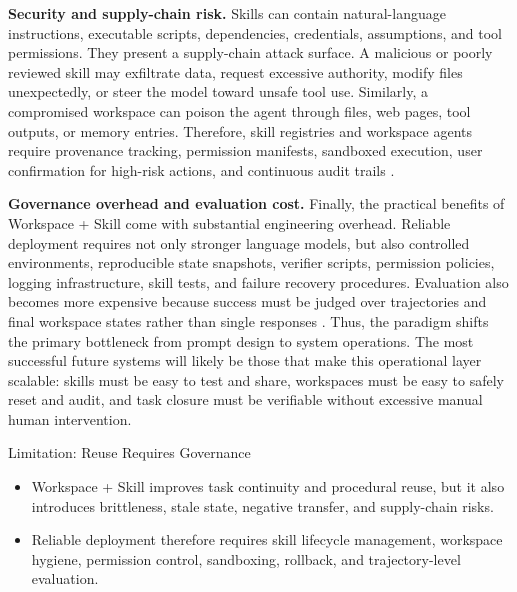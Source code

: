 \textbf{Security and supply-chain risk.}
Skills can contain natural-language instructions, executable scripts, dependencies, credentials, assumptions, and tool permissions.
They present a supply-chain attack surface.
A malicious or poorly reviewed skill may exfiltrate data, request excessive authority, modify files unexpectedly, or steer the model toward unsafe tool use.
Similarly, a compromised workspace can poison the agent through files, web pages, tool outputs, or memory entries.
Therefore, skill registries and workspace agents require provenance tracking, permission manifests, sandboxed execution, user confirmation for high-risk actions, and continuous audit trails \cite{li2026prism,zhao2026clawguard,wang2026openclawsec,Jia2026SkillJectEA,Liu2026ExploitingLA,Liu2026AgentSI}.

\textbf{Governance overhead and evaluation cost.}
Finally, the practical benefits of Workspace + Skill come with substantial engineering overhead.
Reliable deployment requires not only stronger language models, but also controlled environments, reproducible state snapshots, verifier scripts, permission policies, logging infrastructure, skill tests, and failure recovery procedures.
Evaluation also becomes more expensive because success must be judged over trajectories and final workspace states rather than single responses \cite{Qiang2025MLEDojoIE,Zheng2025LifelongAgentBenchEL}.
Thus, the paradigm shifts the primary bottleneck from prompt design to system operations.
The most successful future systems will likely be those that make this operational layer scalable: skills must be easy to test and share, workspaces must be easy to safely reset and audit, and task closure must be verifiable without excessive manual human intervention.

\begin{AIbox}{Limitation: Reuse Requires Governance}
    \begin{itemize}[left=2pt,topsep=1pt,itemsep=2pt, parsep=1pt]
        \item Workspace + Skill improves task continuity and procedural reuse, but it also introduces brittleness, stale state, negative transfer, and supply-chain risks.

        \item Reliable deployment therefore requires skill lifecycle management, workspace hygiene, permission control, sandboxing, rollback, and trajectory-level evaluation.
    \end{itemize}
\end{AIbox}
